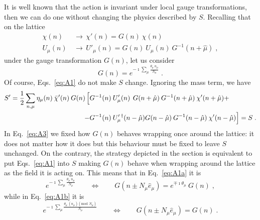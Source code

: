 \documentclass[a4paper,10pt]{article}
\newcommand{\Eq}[1]{Eq.~\eqref{eq:#1}}
\newcommand{\Eqs}[1]{Eqs.~\eqref{eq:#1}}
\begin{document}
It is well known that the action is invariant under local gauge transformations,
then we can do one without changing the physics described by $S$. Recalling that
on the lattice
\begin{subequations}\label{eq:A1}
  \begin{align}
   \chi(n) \,&\to\, \chi'(n)=G(n)\:\chi(n) \label{eq:A1a}\\
   U_\mu(n) \,&\to\, U'_\mu(n)=G(n)\:U_\mu(n)\:G^{-1}(n+\hat\mu) \;, \label{eq:A1b}
  \end{align}
\end{subequations}
under the gauge transformation $G(n)$, let us consider
\begin{equation}\label{eq:A2}
 G(n)=e^{-\imath\sum_\mu\frac{\theta_\mu\:n_\mu}{N_\mu}}\;.
\end{equation}
Of course, \Eqs{A1} do not make $S$ change. Ignoring the mass term, we have
\begin{align}\label{eq:A3}
 S'=\frac{1}{2}\sum_{n,\mu} \eta_\mu(n)\:\bar\chi'(n)\:G(n)\,
                     \Bigl[&G^{-1}(n)\:U'_\mu(n)^{\phantom{\dag}}G(n+\hat\mu)\:G^{-1}(n+\hat\mu)\:\chi'(n+\hat\mu)+\notag\\
                    -&G^{-1}(n)\:U'^{\:\dag}_\mu(n-\hat\mu)G(n-\hat\mu)\:G^{-1}(n-\hat\mu)\:\chi'(n-\hat\mu)\Bigr]=S\;.
\end{align}
In \Eq{A3} we fixed how $G(n)$ behaves wrapping once around the lattice: it does not matter how it does
but this behaviour must be fixed to leave $S$ unchanged. On the contrary, the strategy depicted in the
section \emph{} is equivalent to put \Eqs{A1} into $S$ making $G(n)$ behave when wrapping
around the lattice as the field it is acting on. This means that in \Eq{A1a} it is
\[
 e^{-\imath\sum_\mu\frac{\theta_\mu\:n_\mu}{N_\mu}}
 \qquad\Leftrightarrow\qquad G(n\pm N_\mu\hat{e}_\mu)=e^{\mp\imath\theta_\mu}\:G(n)\;,
\]
while in \Eq{A1b} it is
\[
 e^{-\imath\sum_\mu\frac{\theta_\mu\:(n_\mu)(\text{mod }N_\mu)}{N_\mu}}
 \qquad\Leftrightarrow\qquad G(n\pm N_\mu\hat{e}_\mu)=G(n)\;.
\]
\end{document}
